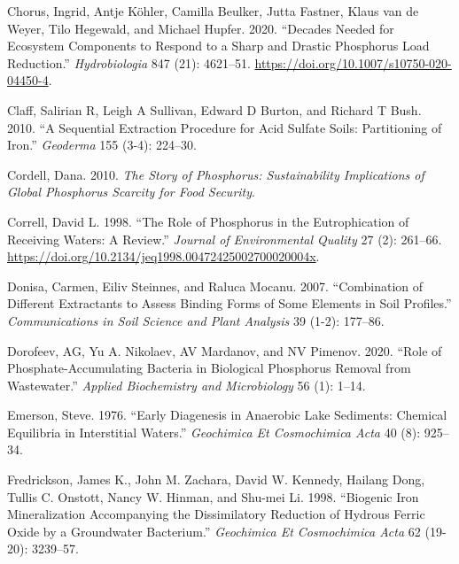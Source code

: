 \documentclass[a4paper,11pt]{article}
\newenvironment{CSLReferences}%
  {}%
  {\par}
\begin{document}
\begin{CSLReferences}{1}{0}
\leavevmode\hypertarget{ref-chorusDecadesNeededEcosystem2020}{}%
Chorus, Ingrid, Antje Köhler, Camilla Beulker, Jutta Fastner, Klaus van de Weyer, Tilo Hegewald, and Michael Hupfer. 2020. {``Decades Needed for Ecosystem Components to Respond to a Sharp and Drastic Phosphorus Load Reduction.''} \emph{Hydrobiologia} 847 (21): 4621--51. \url{https://doi.org/10.1007/s10750-020-04450-4}.

\leavevmode\hypertarget{ref-claffSequentialExtractionProcedure2010}{}%
Claff, Salirian R, Leigh A Sullivan, Edward D Burton, and Richard T Bush. 2010. {``A Sequential Extraction Procedure for Acid Sulfate Soils: Partitioning of Iron.''} \emph{Geoderma} 155 (3-4): 224--30.

\leavevmode\hypertarget{ref-cordell2010}{}%
Cordell, Dana. 2010. \emph{The Story of Phosphorus: Sustainability Implications of Global Phosphorus Scarcity for Food Security}.

\leavevmode\hypertarget{ref-correllRolePhosphorusEutrophication1998}{}%
Correll, David L. 1998. {``The {Role} of {Phosphorus} in the {Eutrophication} of {Receiving Waters}: {A Review}.''} \emph{Journal of Environmental Quality} 27 (2): 261--66. \url{https://doi.org/10.2134/jeq1998.00472425002700020004x}.

\leavevmode\hypertarget{ref-donisaCombinationDifferentExtractants2007}{}%
Donisa, Carmen, Eiliv Steinnes, and Raluca Mocanu. 2007. {``Combination of Different Extractants to Assess Binding Forms of Some Elements in Soil Profiles.''} \emph{Communications in Soil Science and Plant Analysis} 39 (1-2): 177--86.

\leavevmode\hypertarget{ref-dorofeevRolePhosphateaccumulatingBacteria2020a}{}%
Dorofeev, AG, Yu A. Nikolaev, AV Mardanov, and NV Pimenov. 2020. {``Role of Phosphate-Accumulating Bacteria in Biological Phosphorus Removal from Wastewater.''} \emph{Applied Biochemistry and Microbiology} 56 (1): 1--14.

\leavevmode\hypertarget{ref-emersonEarlyDiagenesisAnaerobic1976}{}%
Emerson, Steve. 1976. {``Early Diagenesis in Anaerobic Lake Sediments: Chemical Equilibria in Interstitial Waters.''} \emph{Geochimica Et Cosmochimica Acta} 40 (8): 925--34.

\leavevmode\hypertarget{ref-fredricksonBiogenicIronMineralization1998}{}%
Fredrickson, James K., John M. Zachara, David W. Kennedy, Hailang Dong, Tullis C. Onstott, Nancy W. Hinman, and Shu-mei Li. 1998. {``Biogenic Iron Mineralization Accompanying the Dissimilatory Reduction of Hydrous Ferric Oxide by a Groundwater Bacterium.''} \emph{Geochimica Et Cosmochimica Acta} 62 (19-20): 3239--57.


\end{CSLReferences}
\end{document}
